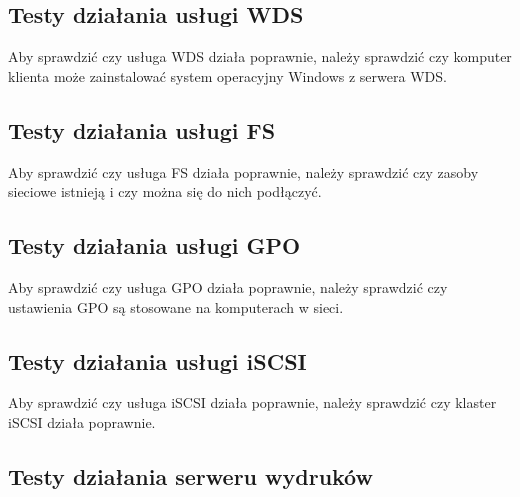 \clearpage

\subsection{Testy działania usługi WDS}

Aby sprawdzić czy usługa WDS działa poprawnie, należy sprawdzić czy komputer klienta może zainstalować system operacyjny Windows z serwera WDS.



\clearpage

\subsection{Testy działania usługi FS}

Aby sprawdzić czy usługa FS działa poprawnie, należy sprawdzić czy zasoby sieciowe istnieją i czy można się do nich podłączyć.


\subsection{Testy działania usługi GPO}

Aby sprawdzić czy usługa GPO działa poprawnie, należy sprawdzić czy ustawienia GPO są stosowane na komputerach w sieci.


\clearpage

\subsection{Testy działania usługi iSCSI}

Aby sprawdzić czy usługa iSCSI działa poprawnie, należy sprawdzić czy klaster iSCSI działa poprawnie.

\clearpage

\subsection{Testy działania serweru wydruków}

